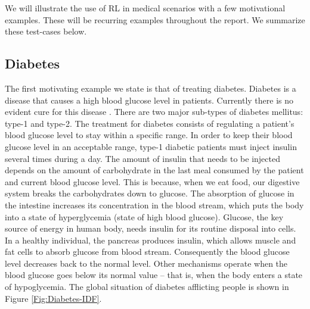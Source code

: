 We will illustrate the use of RL in medical scenarios with a few motivational examples. These will be recurring examples throughout the report. We summarize these test-cases below.

\subsection{Diabetes}

The first motivating example we state is that of treating diabetes. Diabetes is  a disease that causes a high blood glucose level in patients.
Currently there is no evident cure for this disease \citep{holt2011textbook}. There are two major sub-types of diabetes mellitus: type-1 and type-2. The treatment for diabetes consists of regulating a patient’s
blood glucose level to stay within a specific range. In order to keep their blood glucose level in an acceptable range, type-1 diabetic patients must
inject insulin several times during a day. The amount of insulin that needs to be injected depends on the amount of carbohydrate in the last meal consumed by the patient and current blood glucose level. This is because, when we eat food, our digestive system breaks the carbohydrates down to glucose. The absorption of glucose in the intestine increases its concentration in the blood stream, which puts the body into
a state of hyperglycemia (state of high blood glucose). Glucose, the key source of energy in human body, needs insulin for its routine disposal into cells. In a healthy individual, the pancreas produces
insulin, which allows muscle and fat cells to absorb glucose from blood stream. Consequently the blood glucose level decreases back to the normal level. Other mechanisms operate when the blood glucose goes below its normal value – that is, when the body enters a state of hypoglycemia. The global situation of diabetes afflicting people is shown in Figure \ref{Fig:Diabetes-IDF}.


